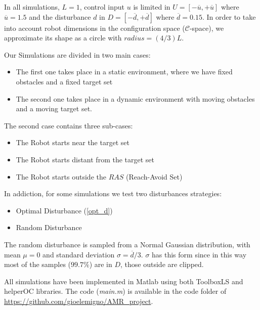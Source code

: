 In all simulations, $L=1$, control input $u$ is limited in $U = [-\overline{u}, +\overline{u}]$ where $\overline{u}=1.5$ and the disturbance $d$ in $D=[-\overline{d}, +\overline{d}]$ where $\overline{d}=0.15$. In order to take into account robot dimensions in the configuration space ($\mathcal{C}$-space), we approximate its shape as a circle with $radius = (4/3)L$.

Our Simulations are divided in two main cases: 
\begin{itemize}
    \item The first one takes place in a static environment, where we have fixed obstacles and a fixed target set 
    \item The second one takes place in a dynamic environment with moving obstacles and a moving target set.
\end{itemize}
The second case contains three sub-cases:  
\begin{itemize}
    \item The Robot starts near the target set
    \item The Robot starts distant from the target set
    \item The Robot starts outside the $RAS$ (Reach-Avoid Set)
\end{itemize}
In addiction, for some simulations we test two disturbances strategies: 
\begin{itemize}
    \item Optimal Disturbance (\ref{opt_d})
    \item Random Disturbance 
\end{itemize}
The random disturbance is sampled from a Normal Gaussian distribution, with mean $\mu=0$ and standard deviation $\sigma=\overline{d}/3$. $\sigma$ has this form since in this way most of the samples ($99.7\%$) are in $D$, those outside are clipped.

All simulations have been implemented in Matlab using both ToolboxLS \cite{LS} and helperOC \cite{brief_intro} libraries. The code (\textit{main.m}) is available in the code folder of \url{https://github.com/gioelemigno/AMR\_project}.


